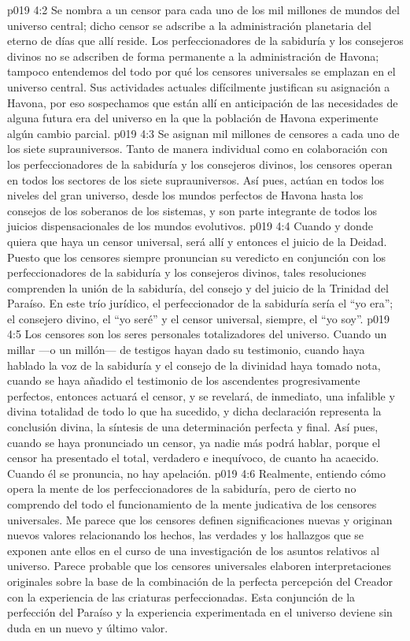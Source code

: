 \vs p019 4:2 Se nombra a un censor para cada uno de los mil millones de mundos del universo central; dicho censor se adscribe a la administración planetaria del eterno de días que allí reside. Los perfeccionadores de la sabiduría y los consejeros divinos no se adscriben de forma permanente a la administración de Havona; tampoco entendemos del todo por qué los censores universales se emplazan en el universo central. Sus actividades actuales difícilmente justifican su asignación a Havona, por eso sospechamos que están allí en anticipación de las necesidades de alguna futura era del universo en la que la población de Havona experimente algún cambio parcial.
\vs p019 4:3 Se asignan mil millones de censores a cada uno de los siete suprauniversos. Tanto de manera individual como en colaboración con los perfeccionadores de la sabiduría y los consejeros divinos, los censores operan en todos los sectores de los siete suprauniversos. Así pues, actúan en todos los niveles del gran universo, desde los mundos perfectos de Havona hasta los consejos de los soberanos de los sistemas, y son parte integrante de todos los juicios dispensacionales de los mundos evolutivos.
\vs p019 4:4 \pc Cuando y donde quiera que haya un censor universal, será allí y entonces el juicio de la Deidad. Puesto que los censores siempre pronuncian su veredicto en conjunción con los perfeccionadores de la sabiduría y los consejeros divinos, tales resoluciones comprenden la unión de la sabiduría, del consejo y del juicio de la Trinidad del Paraíso. En este trío jurídico, el perfeccionador de la sabiduría sería el “yo era”; el consejero divino, el “yo seré” y el censor universal, siempre, el “yo soy”.
\vs p019 4:5 \pc Los censores son los seres personales totalizadores del universo. Cuando un millar ---o un millón--- de testigos hayan dado su testimonio, cuando haya hablado la voz de la sabiduría y el consejo de la divinidad haya tomado nota, cuando se haya añadido el testimonio de los ascendentes progresivamente perfectos, entonces actuará el censor, y se revelará, de inmediato, una infalible y divina totalidad de todo lo que ha sucedido, y dicha declaración representa la conclusión divina, la síntesis de una determinación perfecta y final. Así pues, cuando se haya pronunciado un censor, ya nadie más podrá hablar, porque el censor ha presentado el total, verdadero e inequívoco, de cuanto ha acaecido. Cuando él se pronuncia, no hay apelación.
\vs p019 4:6 Realmente, entiendo cómo opera la mente de los perfeccionadores de la sabiduría, pero de cierto no comprendo del todo el funcionamiento de la mente judicativa de los censores universales. Me parece que los censores definen significaciones nuevas y originan nuevos valores relacionando los hechos, las verdades y los hallazgos que se exponen ante ellos en el curso de una investigación de los asuntos relativos al universo. Parece probable que los censores universales elaboren interpretaciones originales sobre la base de la combinación de la perfecta percepción del Creador con la experiencia de las criaturas perfeccionadas. Esta conjunción de la perfección del Paraíso y la experiencia experimentada en el universo deviene sin duda en un nuevo y último valor.
